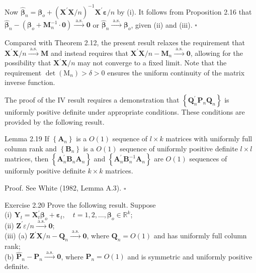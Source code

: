 \documentclass[10pt]{article}
\begin{document}
Now $\hat{\boldsymbol{\beta}}_{n}=\boldsymbol{\beta}_{o}+\left(\mathbf{X}^{\prime} \mathbf{X} / n\right)^{-1} \mathbf{X}^{\prime} \boldsymbol{\varepsilon} / n$ by (i). It follows from Proposition 2.16 that $\hat{\boldsymbol{\beta}}_{n}-\left(\boldsymbol{\beta}_{o}+\mathbf{M}_{n}^{-1} \cdot \mathbf{0}\right) \xrightarrow{\text { a.s. }} \mathbf{0}$ or $\hat{\boldsymbol{\beta}}_{n} \xrightarrow{\text { a.s. }} \boldsymbol{\beta}_{o}$, given (ii) and (iii). \(\square\)

Compared with Theorem 2.12, the present result relaxes the requirement that $\mathbf{X}^{\prime} \mathbf{X} / n \xrightarrow{\text { a.s. }} \mathbf{M}$ and instead requires that $\mathbf{X}^{\prime} \mathbf{X} / n-\mathbf{M}_{n} \xrightarrow{\text { a.s. }} \mathbf{0}$, allowing for the possibility that $\mathbf{X}^{\prime} \mathbf{X} / n$ may not converge to a fixed limit. Note that the requirement $\operatorname{det}\left(\mathrm{M}_{n}\right)>\delta>0$ ensures the uniform continuity of the matrix inverse function.

The proof of the IV result requires a demonstration that $\left\{\mathbf{Q}_{n}^{\prime} \mathbf{P}_{n} \mathbf{Q}_{n}\right\}$ is uniformly positive definite under appropriate conditions. These conditions are provided by the following result.

Lemma 2.19 If $\left\{\mathbf{A}_{n}\right\}$ is a $O(1)$ sequence of $l \times k$ matrices with uniformly full column rank and $\left\{\mathbf{B}_{n}\right\}$ is a $O(1)$ sequence of uniformly positive definite $l \times l$ matrices, then $\left\{\mathbf{A}_{n}^{\prime} \mathbf{B}_{n} \mathbf{A}_{n}\right\}$ and $\left\{\mathbf{A}_{n}^{\prime} \mathbf{B}_{n}^{-1} \mathbf{A}_{n}\right\}$ are $O(1)$ sequences of uniformly positive definite $k \times k$ matrices.

Proof. See White (1982, Lemma A.3). \(\square\)

Exercise 2.20 Prove the following result. Suppose\\
(i) $\mathbf{Y}_{t}=\mathbf{X}_{t}^{\prime} \boldsymbol{\beta}_{o}+\boldsymbol{\varepsilon}_{t}, \quad t=1,2, \ldots, \boldsymbol{\beta}_{o} \in \mathbb{R}^{k}$;\\
(ii) $\mathbf{Z}^{\prime} \varepsilon / n \xrightarrow{\text { a.s. }} \mathbf{0}$;\\
(iii) (a) $\mathbf{Z}^{\prime} \mathbf{X} / n-\mathbf{Q}_{n} \xrightarrow{\text { a.s. }} \mathbf{0}$, where $\mathbf{Q}_{n}=O(1)$ and has uniformly full column rank;\\
(b) $\hat{\mathbf{P}}_{n}-\mathbf{P}_{n} \xrightarrow{\text { a.s. }} \mathbf{0}$, where $\mathbf{P}_{n}=O(1)$ and is symmetric and uniformly positive definite.
\end{document}
